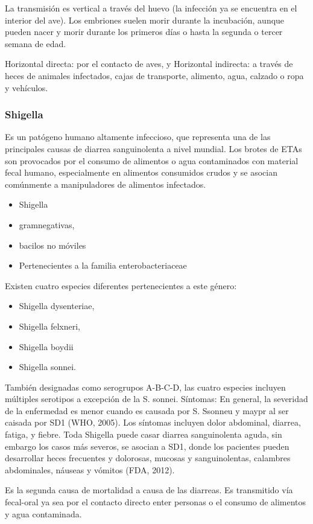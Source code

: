 La transmisión es vertical a través del huevo (la infección ya se encuentra en el interior del ave). Los embriones suelen morir durante la incubación, aunque pueden nacer y morir durante los primeros días o hasta la segunda o tercer semana de edad.

Horizontal directa: por el contacto de aves, y Horizontal indirecta: a través de heces de animales infectados, cajas de transporte, alimento, agua, calzado o ropa y vehículos.
\subsubsection{Shigella}
Es un patógeno humano altamente infeccioso, que representa una de las principales causas de diarrea sanguinolenta a nivel mundial. Los brotes de ETAs son provocados por el consumo de alimentos o agua contaminados con material fecal humano, especialmente en alimentos consumidos crudos y se asocian comúnmente a manipuladores de alimentos infectados.
\begin{itemize}
    \item Shigella 
    \item gramnegativas, 
    \item bacilos no móviles
    \item Pertenecientes a la familia enterobacteriaceae
\end{itemize}
Existen cuatro especies diferentes pertenecientes a este género:
\begin{itemize}
    \item Shigella dysenteriae, 
    \item Shigella felxneri, 
    \item Shigella boydii
    \item Shigella sonnei.
\end{itemize}
También designadas como serogrupos A-B-C-D, las cuatro especies incluyen múltiples serotipos a excepción de la S. sonnei.
Síntomas: En general, la severidad de la enfermedad es menor cuando es causada por S. Ssonneu y maypr al ser caisada por SD1 (WHO, 2005). Los síntomas incluyen dolor abdominal, diarrea, fatiga, y fiebre. Toda Shigella puede casar diarrea sanguinolenta aguda, sin embargo los casos más severos, se asocian a SD1, donde los pacientes pueden desarrollar heces frecuentes y dolorosas, mucosas y sanguinolentas, calambres abdominales, náuseas y vómitos (FDA, 2012).

Es la segunda causa de mortalidad a causa de las diarreas. Es transmitido vía fecal-oral ya sea por el contacto directo enter personas o el consumo de alimentos y agua contaminada.

